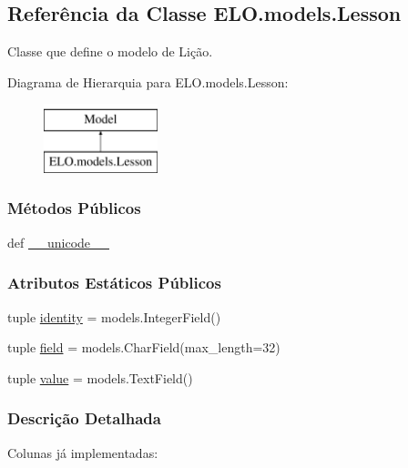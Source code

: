 \hypertarget{classELO_1_1models_1_1Lesson}{\subsection{Referência da Classe E\-L\-O.\-models.\-Lesson}
\label{classELO_1_1models_1_1Lesson}
}


Classe que define o modelo de Lição.  


Diagrama de Hierarquia para E\-L\-O.\-models.\-Lesson\-:\begin{figure}[H]
\begin{center}
\leavevmode
\includegraphics[height=2.000000cm]{d0/da3/classELO_1_1models_1_1Lesson}
\end{center}
\end{figure}
\subsubsection*{Métodos Públicos}
\begin{DoxyCompactItemize}
\item 
def \hyperlink{classELO_1_1models_1_1Lesson_a3d9f0295dbe1ed5c74668d6c0876f97c}{\-\_\-\-\_\-unicode\-\_\-\-\_\-}
\end{DoxyCompactItemize}
\subsubsection*{Atributos Estáticos Públicos}
\begin{DoxyCompactItemize}
\item 
tuple \hyperlink{classELO_1_1models_1_1Lesson_aa650c6add387eee9e15421717074c0d3}{identity} = models.\-Integer\-Field()
\item 
tuple \hyperlink{classELO_1_1models_1_1Lesson_a1657c9c36e8d9c58d86c272e2339e7b1}{field} = models.\-Char\-Field(max\-\_\-length=32)
\item 
tuple \hyperlink{classELO_1_1models_1_1Lesson_a27927b9763fb13a9e41b3f826439c600}{value} = models.\-Text\-Field()
\end{DoxyCompactItemize}


\subsubsection{Descrição Detalhada}
Colunas já implementadas\-:

